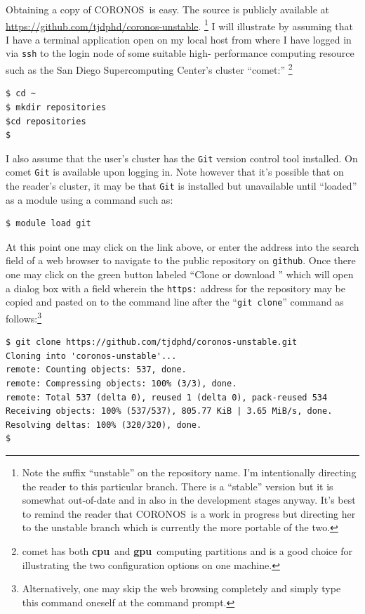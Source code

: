 \documentclass[12pt, letterpaper, oneside, leqno, openright]{memoir}
\newcommand{\cpu}{\textbf{cpu}}
\newcommand{\gpu}{\textbf{gpu}}
\newcommand{\coronos}{\textsf{CORONOS}}
\begin{document}
Obtaining a copy of \coronos\ is easy. The source is publicly
available at \url{https://github.com/tjdphd/coronos-unstable}.
\footnote{Note the suffix ``unstable'' on the repository name.
I'm intentionally directing the reader to this particular branch.
There is a ``stable'' version but it is somewhat out-of-date
and in also in the development stages anyway. It's best to remind
the reader that \coronos\ is a work in progress but directing
her to the unstable branch which is currently the more portable
of the two.} I will illustrate by assuming that I have a terminal
application open on my local host from where I have logged in
via \texttt{ssh} to the login node of some suitable high-
performance computing resource such as the San Diego 
Supercomputing Center's cluster ``comet:'' \footnote{comet has
both \cpu\ and \gpu\ computing partitions and is a good choice
for illustrating the two configuration options on one machine.}
%
%
\begin{verbatim}
$ cd ~
$ mkdir repositories  
$cd repositories
$
\end{verbatim}
%
I also assume that the user's cluster has the \texttt{Git}
version control tool installed. On comet \texttt{Git} is
available upon logging in. Note however that it's possible that
on the reader's cluster, it may be that \texttt{Git} is 
installed but unavailable until ``loaded'' as a module 
using a command such as:
%
%
%
\begin{verbatim}
$ module load git
\end{verbatim}
%
%
At this point one may click on the link above, or enter the
address into the search field of a web browser to navigate to 
the public repository on \texttt{github}. Once there one may
click on the green button labeled ``Clone or download '' which
will open a dialog box with a field wherein the \texttt{https:}
address for the repository may be copied and pasted on to the 
command line after the ``\texttt{git clone}'' command as 
follows:\footnote{Alternatively, one may skip the web browsing
completely and simply type this command oneself at the command
prompt.}
%
\begin{verbatim}
$ git clone https://github.com/tjdphd/coronos-unstable.git
Cloning into 'coronos-unstable'...
remote: Counting objects: 537, done.
remote: Compressing objects: 100% (3/3), done.
remote: Total 537 (delta 0), reused 1 (delta 0), pack-reused 534
Receiving objects: 100% (537/537), 805.77 KiB | 3.65 MiB/s, done.
Resolving deltas: 100% (320/320), done.
$
\end{verbatim}
\end{document}
